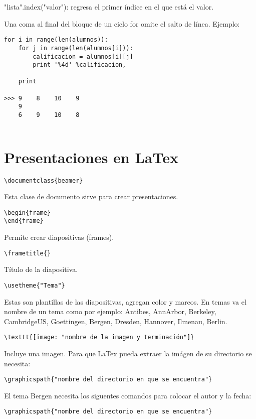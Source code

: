 \documentclass[letter paper, 12pt, oneside]{article}
\begin{document}
"lista".index("valor"): regresa el primer índice en el que está el valor. 

Una coma al final del bloque de un ciclo for omite el salto de línea. Ejemplo:
\\
\begin{verbatim}
for i in range(len(alumnos)):
    for j in range(len(alumnos[i])):
        calificacion = alumnos[i][j]
        print '%4d' %calificacion,

    print
    
>>> 9    8    10    9
    9
    6    9    10    8


\end{verbatim}
\section{Presentaciones en LaTex}
\begin{verbatim}
\documentclass{beamer}
\end{verbatim}
Esta clase de documento sirve para crear presentaciones.
\begin{verbatim}
\begin{frame}
\end{frame}
\end{verbatim}
Permite crear diapositivas (frames).

\begin{verbatim}
\frametitle{}
\end{verbatim}
Título de la diapositiva. 

\begin{verbatim}
\usetheme{"Tema"}
\end{verbatim}
Estas son plantillas de las diapositivas, agregan color y marcos. En temas va el nombre de un tema como por ejemplo: Antibes, AnnArbor, Berkeley, CambridgeUS, Goettingen, Bergen, Dresden, Hannover, Ilmenau, Berlin.  

\begin{verbatim}
\texttt{[image: "nombre de la imagen y terminación"]}
\end{verbatim}
Incluye una imagen. Para que LaTex pueda extraer la imágen de su directorio se necesita:
\begin{verbatim}
\graphicspath{"nombre del directorio en que se encuentra"}
\end{verbatim}

El tema Bergen necesita los siguentes comandos para colocar el autor y la fecha:
\begin{verbatim}
\graphicspath{"nombre del directorio en que se encuentra"}
\end{verbatim}
\def\instertauthorindicator{¿Quién?}
\def\insertdateindicator{Fecha}
\end{document}
